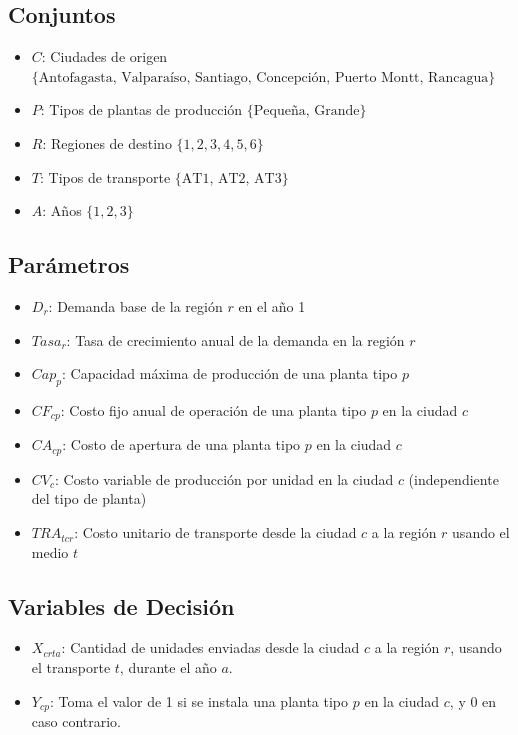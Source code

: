 \documentclass{article}
\begin{document}
\subsection{Conjuntos}
\begin{itemize}
    \item $C$: Ciudades de origen $\{\text{Antofagasta, Valparaíso, Santiago, Concepción, Puerto Montt, Rancagua}\}$
    \item $P$: Tipos de plantas de producción $\{\text{Pequeña, Grande}\}$
    \item $R$: Regiones de destino $\{1, 2, 3, 4, 5, 6\}$
    \item $T$: Tipos de transporte $\{\text{AT1, AT2, AT3}\}$
    \item $A$: Años $\{1, 2, 3\}$
\end{itemize}

\subsection{Parámetros}
\begin{itemize}
    \item $D_r$: Demanda base de la región $r$ en el año 1
    \item $Tasa_r$: Tasa de crecimiento anual de la demanda en la región $r$
    \item $Cap_p$: Capacidad máxima de producción de una planta tipo $p$
    \item $CF_{cp}$: Costo fijo anual de operación de una planta tipo $p$ en la ciudad $c$
    \item $CA_{cp}$: Costo de apertura de una planta tipo $p$ en la ciudad $c$
    \item $CV_c$: Costo variable de producción por unidad en la ciudad $c$ (independiente del tipo de planta)
    \item $TRA_{tcr}$: Costo unitario de transporte desde la ciudad $c$ a la región $r$ usando el medio $t$
\end{itemize}

\subsection{Variables de Decisión}
\begin{itemize}
    \item $X_{crta}$: Cantidad de unidades enviadas desde la ciudad $c$ a la región $r$, usando el transporte $t$, durante el año $a$.
    \item $Y_{cp}$: Toma el valor de 1 si se instala una planta tipo $p$ en la ciudad $c$, y 0 en caso contrario.
\end{itemize}
\end{document}
